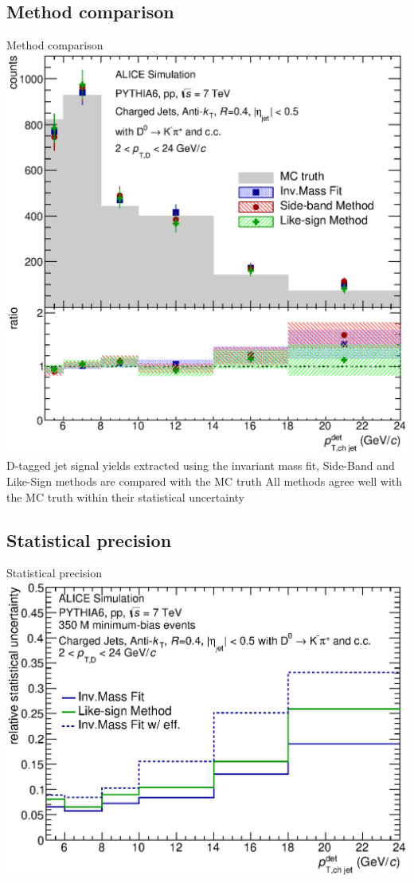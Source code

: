 \documentclass{beamer}
\begin{document}
\subsection{Method comparison}
\begin{frame}{Method comparison}
\includegraphics[width=.6\paperwidth]{img/HQ16_Simulation_MethodComparison}
D-tagged jet signal yields extracted using the invariant mass fit, Side-Band and Like-Sign methods are compared with the MC truth
\newline
All methods agree well with the MC truth within their statistical uncertainty
\end{frame}

\subsection{Statistical precision}
\begin{frame}{Statistical precision}
\includegraphics[width=.5\paperwidth]{img/HQ16_Simulation_UncertaintyComparison}
\end{frame}
\end{document}
